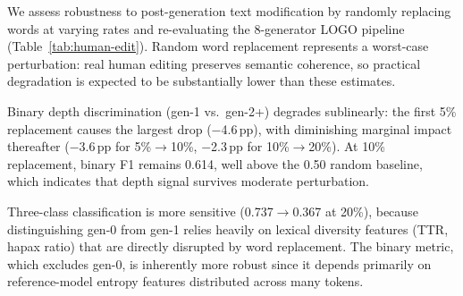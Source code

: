 We assess robustness to post-generation text modification by randomly replacing words at varying rates and re-evaluating the 8-generator LOGO pipeline (Table~\ref{tab:human-edit}).
Random word replacement represents a worst-case perturbation: real human editing preserves semantic coherence, so practical degradation is expected to be substantially lower than these estimates.

\begin{table}[ht]
\centering
\small
\caption{Robustness to random word replacement under 8-gen LOGO evaluation (binary: gen-1 vs.\ gen-2+). Bootstrap 95\% CIs on binary F1 ($n$\,=\,1000).}
\label{tab:human-edit}
\end{table}

Binary depth discrimination (gen-1 vs.\ gen-2+) degrades sublinearly: the first 5\% replacement causes the largest drop ($-$4.6\,pp), with diminishing marginal impact thereafter ($-$3.6\,pp for 5\%$\to$10\%, $-$2.3\,pp for 10\%$\to$20\%).
At 10\% replacement, binary F1 remains 0.614, well above the 0.50 random baseline, which indicates that depth signal survives moderate perturbation.

Three-class classification is more sensitive (0.737$\to$0.367 at 20\%), because distinguishing gen-0 from gen-1 relies heavily on lexical diversity features (TTR, hapax ratio) that are directly disrupted by word replacement.
The binary metric, which excludes gen-0, is inherently more robust since it depends primarily on reference-model entropy features distributed across many tokens.


